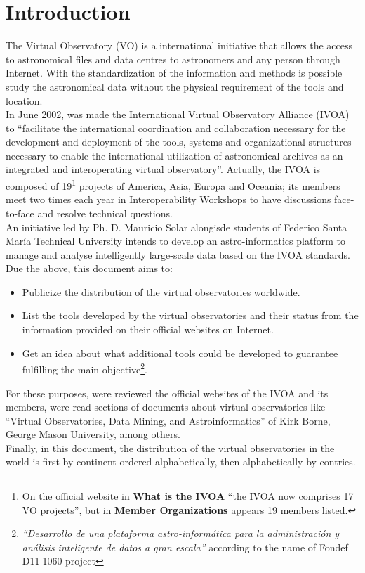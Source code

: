 \section{Introduction}
The Virtual Observatory (VO) \nocite{Borne2013} \nocite{HanischQuinn2003} is a
international initiative that allows the access to astronomical files and data
centres to astronomers and any person through Internet. With the standardization
of the information and methods is possible study the astronomical data without
the physical requirement of the tools and location.\\

In June 2002, was made the International Virtual Observatory Alliance (IVOA)
\cite{website:ivoa-home} to ``facilitate the international coordination and
collaboration necessary for the development and deployment of the tools, systems
and organizational structures necessary to enable the international utilization
of astronomical archives as an integrated and interoperating virtual
observatory''.  Actually, the IVOA is composed of 19\footnote{On the official
website in \textbf{What is the IVOA} ``the IVOA now comprises 17 VO projects'',
but in \textbf{Member Organizations} appears 19 members listed.} projects of
America, Asia, Europa and Oceania; its members meet two times each year in
Interoperability  Workshops to have discussions face-to-face and resolve
technical questions.\\

An initiative led by Ph. D. Mauricio Solar alongisde students of Federico Santa
Mar\'{i}a Technical University intends to develop an astro-informatics platform
to manage and analyse intelligently large-scale data based on the IVOA
standards. Due the above, this document aims to:

\begin{itemize}
	\item Publicize the distribution of the virtual observatories worldwide.
    \item List the tools developed by the virtual observatories and their status
from the information provided on their official websites on Internet.
    \item Get an idea about what additional tools could be developed to
guarantee fulfilling the main objective\footnote{\textit{``Desarrollo de una
plataforma astro-inform\'{a}tica para la administraci\'{o}n y an\'{a}lisis
inteligente de datos a gran escala''} according to the name of Fondef D11$
\vert $1060 project}.
\end{itemize}

For these purposes, were reviewed the official websites of the IVOA and its
members, were read sections of documents about virtual observatories like
``Virtual Observatories, Data Mining, and Astroinformatics'' of Kirk Borne,
George Mason University, among others.\\

Finally, in this document, the distribution of the virtual observatories in the
world is first by continent ordered alphabetically, then alphabetically by
contries.\\
